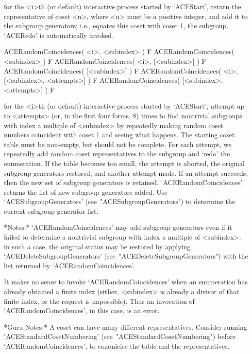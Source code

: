 for the <i>th (or  default)  interactive  {\ACE}  process  started  by
`ACEStart', return the representative of coset <n>, where <n> must  be
a positive integer, and add  it  to  the  subgroup  generators;  i.e.,
equates  this  coset  with  coset  1,  the  subgroup.   `ACERedo'   is
automatically invoked.

\>ACERandomCoincidences( <i>, <subindex> ) F
\>ACERandomCoincidences( <subindex> ) F
\>ACERandomCoincidences( <i>, [<subindex>] ) F
\>ACERandomCoincidences( [<subindex>] ) F
\>ACERandomCoincidences( <i>, [<subindex>, <attempts>] ) F
\>ACERandomCoincidences( [<subindex>, <attempts>] ) F

for the <i>th (or  default)  interactive  {\ACE}  process  started  by
`ACEStart', attempt up to <attempts> (or, in the first four forms,  8)
times to find nontrivial subgroups with index a multiple of <subindex>
by repeatedly making random coset numbers coincident with coset 1  and
seeing what happens. The starting coset table must be  non-empty,  but
should not be complete. For each attempt,  we  repeatedly  add  random
coset representatives to the subgroup and `redo' the  enumeration.  If
the table becomes too small, the  attempt  is  aborted,  the  original
subgroup generators restored, and another attempt made. If an  attempt
succeeds, then  the  new  set  of  subgroup  generators  is  retained.
`ACERandomCoincidences' returns the list of  new  subgroup  generators
added. Use  `ACESubgroupGenerators'  (see~"ACESubgroupGenerators")  to
determine the current subgroup generator list.

*Notes:* 
`ACERandomCoincidences' may add subgroup generators even if it  failed
to  determine  a  nontrivial  subgroup  with  index  a   multiple   of
<subindex>; in such a case, the original status  may  be  restored  by
applying                                 `ACEDeleteSubgroupGenerators'
(see~"ACEDeleteSubgroupGenerators")  with   the   list   returned   by
`ACERandomCoincidences'.

It  makes  no  sense  to  invoke   `ACERandomCoincidences'   when   an
enumeration has already obtained a finite index (either, <subindex> is
already a divisor of that finite index, or the request is impossible).
Thus an invocation of `ACERandomCoincidences', in  this  case,  is  an
error.

*Guru  Notes:*  A  coset  can  have  many  different  representatives.
Consider              running              `ACEStandardCosetNumbering'
(see~"ACEStandardCosetNumbering") before  `ACERandomCoincidences',  to
canonicise the table and the representatives.

